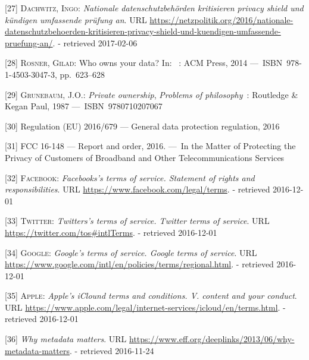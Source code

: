 \documentclass[12pt,english,a4paper,titlepage,cleardoublepage=empty,dottedtoc]{report}
\begin{document}
\hypertarget{ref-web_2017_privacy-shield_kritik}{}
{[}27{]} \textsc{Dachwitz, Ingo}: \emph{Nationale datenschutzbehörden
kritisieren privacy shield und kündigen umfassende prüfung an}. URL
\url{https://netzpolitik.org/2016/nationale-datenschutzbehoerden-kritisieren-privacy-shield-und-kuendigen-umfassende-pruefung-an/}.
- retrieved 2017-02-06

\hypertarget{ref-paper_2014_who-owns-yours-data}{}
{[}28{]} \textsc{Rosner, Gilad}: Who owns your data? In: ~: ACM Press,
2014 ---~ISBN~978-1-4503-3047-3, pp.~623--628

\hypertarget{ref-book_1987_private-ownership_definition}{}
{[}29{]} \textsc{Grunebaum, J.O.}: \emph{Private ownership},
\emph{Problems of philosophy}~: Routledge \& Kegan Paul, 1987
---~ISBN~9780710207067

\hypertarget{ref-regulation_2016_eu_general-data-protection-regulation_ownership}{}
{[}30{]} Regulation (EU) 2016/679 --- General data protection
regulation, 2016

\hypertarget{ref-rules_2016_fcc_to-protect-broadband-consumer-privacy_ownership}{}
{[}31{]} FCC 16-148 --- Report and order, 2016. ---~In the Matter of
Protecting the Privacy of Customers of Broadband and Other
Telecommunications Services

\hypertarget{ref-web_2016_facebook_terms-of-service}{}
{[}32{]} \textsc{Facebook}: \emph{Facebooks's terms of service.
Statement of rights and responsibilities}. URL
\url{https://www.facebook.com/legal/terms}. - retrieved 2016-12-01

\hypertarget{ref-web_2016_twitter_terms-of-service}{}
{[}33{]} \textsc{Twitter}: \emph{Twitters's terms of service. Twitter
terms of service}. URL \url{https://twitter.com/tos\#intlTerms}. -
retrieved 2016-12-01

\hypertarget{ref-web_2016_google_terms-of-service}{}
{[}34{]} \textsc{Google}: \emph{Google's terms of service. Google terms
of service}. URL
\url{https://www.google.com/intl/en/policies/terms/regional.html}. -
retrieved 2016-12-01

\hypertarget{ref-web_2016_apple-icloud_terms-of-service}{}
{[}35{]} \textsc{Apple}: \emph{Apple's iClound terms and conditions. V.
content and your conduct}. URL
\url{https://www.apple.com/legal/internet-services/icloud/en/terms.html}.
- retrieved 2016-12-01

\hypertarget{ref-web_2013_why-metadata-matters}{}
{[}36{]} \emph{Why metadata matters}. URL
\url{https://www.eff.org/deeplinks/2013/06/why-metadata-matters}. -
retrieved 2016-11-24
\end{document}
